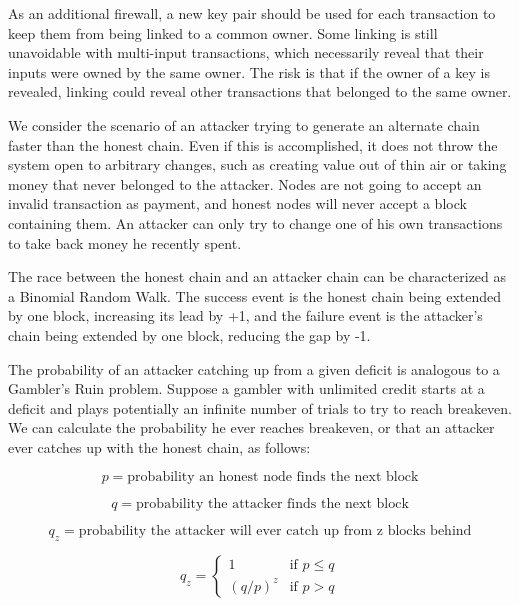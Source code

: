 \documentclass{article}
\begin{document}
As an additional firewall, a new key pair should be used for each transaction to keep them from being linked to a common owner. Some linking is still unavoidable with multi-input transactions, which necessarily reveal that their inputs were owned by the same owner. The risk is that if the owner of a key is revealed, linking could reveal other transactions that belonged to the same owner.

We consider the scenario of an attacker trying to generate an alternate chain faster than the honest chain. Even if this is accomplished, it does not throw the system open to arbitrary changes, such as creating value out of thin air or taking money that never belonged to the attacker. Nodes are not going to accept an invalid transaction as payment, and honest nodes will never accept a block containing them. An attacker can only try to change one of his own transactions to take back money he recently spent.

The race between the honest chain and an attacker chain can be characterized as a Binomial Random Walk. The success event is the honest chain being extended by one block, increasing its lead by +1, and the failure event is the attacker's chain being extended by one block, reducing the gap by -1.

The probability of an attacker catching up from a given deficit is analogous to a Gambler's Ruin problem. Suppose a gambler with unlimited credit starts at a deficit and plays potentially an infinite number of trials to try to reach breakeven. We can calculate the probability he ever reaches breakeven, or that an attacker ever catches up with the honest chain, as follows:

\begin{equation}
p = \text{probability an honest node finds the next block}
\end{equation}

\begin{equation}
q = \text{probability the attacker finds the next block}
\end{equation}

\begin{equation}
q_z = \text{probability the attacker will ever catch up from z blocks behind}
\end{equation}

\begin{equation}
q_z = \begin{cases}
1 & \text{if } p \leq q \\
(q/p)^z & \text{if } p > q
\end{cases}
\end{equation}
\end{document}
